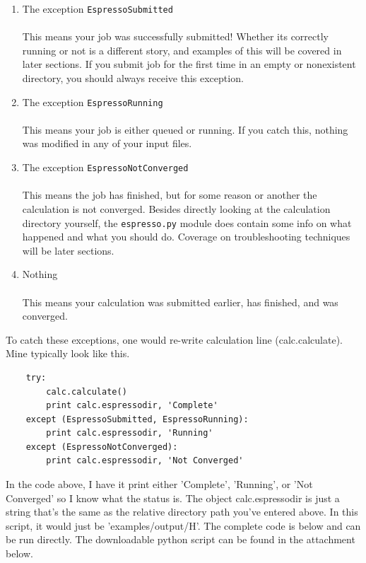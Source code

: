 \documentclass[colorlinks=true,urlcolor=blue,linkcolor=blue,citecolor=red]{article}
\begin{document}
\begin{enumerate}
\item The exception \texttt{EspressoSubmitted} \\ \\
   This means your job was successfully submitted! Whether its correctly running or not is a different story, and examples of this will be covered in later sections. If you submit job for the first time in an empty or nonexistent directory, you should always receive this exception.

\item The exception \texttt{EspressoRunning} \\ \\
   This means your job is either queued or running. If you catch this, nothing was modified in any of your input files.

\item The exception \texttt{EspressoNotConverged} \\ \\
   This means the job has finished, but for some reason or another the calculation is not converged. Besides directly looking at the calculation directory yourself, the \texttt{espresso.py} module does contain some info on what happened and what you should do. Coverage on troubleshooting techniques will be later sections.

\item Nothing \\ \\
   This means your calculation was submitted earlier, has finished, and was converged.
\end{enumerate}

To catch these exceptions, one would re-write calculation line (calc.calculate). Mine typically look like this.

\begin{verbatim}
    try:
        calc.calculate()
        print calc.espressodir, 'Complete'
    except (EspressoSubmitted, EspressoRunning):
        print calc.espressodir, 'Running'
    except (EspressoNotConverged):
        print calc.espressodir, 'Not Converged'
\end{verbatim}

In the code above, I have it print either 'Complete', 'Running', or 'Not Converged' so I know what the status is. The object calc.espressodir is just a string that's the same as the relative directory path you've entered above. In this script, it would just be 'examples/output/H'. The complete code is below and can be run directly. The downloadable python script can be found in the attachment below.
\end{document}
